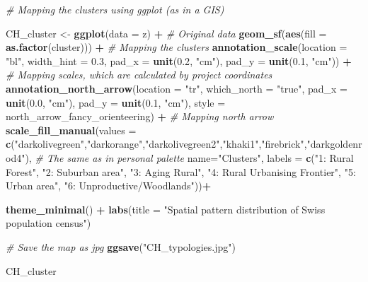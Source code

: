 \documentclass[
]{article}
\newenvironment{Shaded}{\begin{snugshade}}{\end{snugshade}}
\newcommand{\AttributeTok}[1]{\textcolor[rgb]{0.13,0.29,0.53}{#1}}
\newcommand{\CommentTok}[1]{\textcolor[rgb]{0.56,0.35,0.01}{\textit{#1}}}
\newcommand{\FloatTok}[1]{\textcolor[rgb]{0.00,0.00,0.81}{#1}}
\newcommand{\FunctionTok}[1]{\textcolor[rgb]{0.13,0.29,0.53}{\textbf{#1}}}
\newcommand{\NormalTok}[1]{#1}
\newcommand{\OtherTok}[1]{\textcolor[rgb]{0.56,0.35,0.01}{#1}}
\newcommand{\SpecialCharTok}[1]{\textcolor[rgb]{0.81,0.36,0.00}{\textbf{#1}}}
\newcommand{\StringTok}[1]{\textcolor[rgb]{0.31,0.60,0.02}{#1}}
\begin{document}
\begin{Shaded}
\begin{Highlighting}[]
\CommentTok{\# Mapping the clusters using ggplot (as in a GIS)}

\NormalTok{CH\_cluster }\OtherTok{\textless{}{-}} \FunctionTok{ggplot}\NormalTok{(}\AttributeTok{data =}\NormalTok{ z) }\SpecialCharTok{+} \CommentTok{\# Original data}
    \FunctionTok{geom\_sf}\NormalTok{(}\FunctionTok{aes}\NormalTok{(}\AttributeTok{fill =} \FunctionTok{as.factor}\NormalTok{(cluster))) }\SpecialCharTok{+} \CommentTok{\# Mapping the clusters}
    \FunctionTok{annotation\_scale}\NormalTok{(}\AttributeTok{location =} \StringTok{"bl"}\NormalTok{, }\AttributeTok{width\_hint =} \FloatTok{0.3}\NormalTok{,}
                     \AttributeTok{pad\_x =} \FunctionTok{unit}\NormalTok{(}\FloatTok{0.2}\NormalTok{, }\StringTok{"cm"}\NormalTok{), }\AttributeTok{pad\_y =} \FunctionTok{unit}\NormalTok{(}\FloatTok{0.1}\NormalTok{, }\StringTok{"cm"}\NormalTok{)) }\SpecialCharTok{+} 
\CommentTok{\# Mapping scales, which are calculated by project coordinates}
    \FunctionTok{annotation\_north\_arrow}\NormalTok{(}\AttributeTok{location =} \StringTok{"tr"}\NormalTok{, }\AttributeTok{which\_north =} \StringTok{"true"}\NormalTok{, }
          \AttributeTok{pad\_x =} \FunctionTok{unit}\NormalTok{(}\FloatTok{0.0}\NormalTok{, }\StringTok{"cm"}\NormalTok{), }\AttributeTok{pad\_y =} \FunctionTok{unit}\NormalTok{(}\FloatTok{0.1}\NormalTok{, }\StringTok{"cm"}\NormalTok{),}
          \AttributeTok{style =}\NormalTok{ north\_arrow\_fancy\_orienteering) }\SpecialCharTok{+} \CommentTok{\# Mapping north arrow}
    \FunctionTok{scale\_fill\_manual}\NormalTok{(}\AttributeTok{values =} \FunctionTok{c}\NormalTok{(}\StringTok{"darkolivegreen"}\NormalTok{,}\StringTok{"darkorange"}\NormalTok{,}\StringTok{"darkolivegreen2"}\NormalTok{,}\StringTok{"khaki1"}\NormalTok{,}\StringTok{"firebrick"}\NormalTok{,}\StringTok{"darkgoldenrod4"}\NormalTok{), }\CommentTok{\# The same as in personal palette  }
                  \AttributeTok{name=}\StringTok{"Clusters"}\NormalTok{,}
         \AttributeTok{labels =} \FunctionTok{c}\NormalTok{(}\StringTok{"1: Rural Forest"}\NormalTok{,}
                    \StringTok{"2: Suburban area"}\NormalTok{,}
                    \StringTok{"3: Aging Rural"}\NormalTok{,}
                    \StringTok{"4: Rural Urbanising Frontier"}\NormalTok{,}
                    \StringTok{"5: Urban area"}\NormalTok{,}
                    \StringTok{"6: Unproductive/Woodlands"}\NormalTok{))}\SpecialCharTok{+}
                  
    \FunctionTok{theme\_minimal}\NormalTok{() }\SpecialCharTok{+}
    \FunctionTok{labs}\NormalTok{(}\AttributeTok{title =} \StringTok{"Spatial pattern distribution of Swiss population census"}\NormalTok{)}

\CommentTok{\# Save the map as jpg}
\FunctionTok{ggsave}\NormalTok{(}\StringTok{"CH\_typologies.jpg"}\NormalTok{)}
    
\NormalTok{CH\_cluster}
\end{Highlighting}
\end{Shaded}
\end{document}
